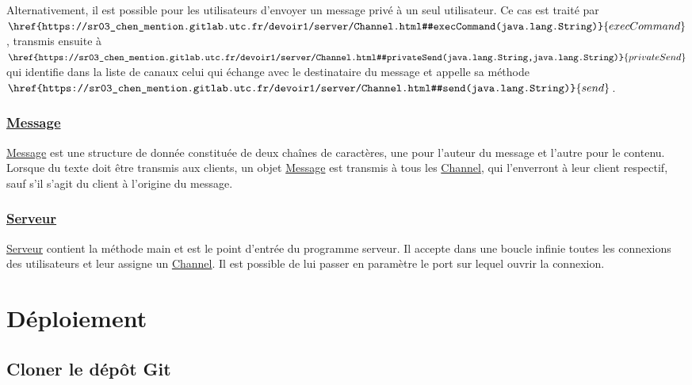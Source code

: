 \documentclass[10pt,a4paper]{article}
\begin{document}
	Alternativement, il est possible pour les utilisateurs d'envoyer un message privé à un seul utilisateur. Ce cas est traité par $\href{https://sr03_chen_mention.gitlab.utc.fr/devoir1/server/Channel.html#execCommand(java.lang.String)}{execCommand}$, transmis ensuite à $\href{https://sr03_chen_mention.gitlab.utc.fr/devoir1/server/Channel.html#privateSend(java.lang.String,java.lang.String)}{privateSend}$ qui identifie dans la liste de canaux celui qui échange avec le destinataire du message et appelle sa méthode $\href{https://sr03_chen_mention.gitlab.utc.fr/devoir1/server/Channel.html#send(java.lang.String)}{send}$.
	
	
	
	\subsubsection{\href{https://sr03_chen_mention.gitlab.utc.fr/devoir1/server/Message.html}{Message}}
	\href{https://sr03_chen_mention.gitlab.utc.fr/devoir1/server/Message.html}{Message} est une structure de donnée constituée de deux chaînes de caractères, une pour l'auteur du message et l'autre pour le contenu. Lorsque du texte doit être transmis aux clients, un objet \href{https://sr03_chen_mention.gitlab.utc.fr/devoir1/server/Message.html}{Message} est transmis à tous les \href{https://sr03_chen_mention.gitlab.utc.fr/devoir1/server/Channel.html}{Channel}, qui l'enverront à leur client respectif, sauf s'il s'agit du client à l'origine du message.
	
	\subsubsection{\href{https://sr03_chen_mention.gitlab.utc.fr/devoir1/server/Message.html}{Serveur}}
	\href{https://sr03_chen_mention.gitlab.utc.fr/devoir1/server/Message.html}{Serveur} contient la méthode main et est le point d'entrée du programme serveur. Il accepte dans une boucle infinie toutes les connexions des utilisateurs et leur assigne un \href{https://sr03_chen_mention.gitlab.utc.fr/devoir1/server/Channel.html}{Channel}. Il est possible de lui passer en paramètre le port sur lequel ouvrir la connexion.
	

	
	\section{Déploiement}
	
	\subsection{Cloner le dépôt Git}
	
\end{document}
